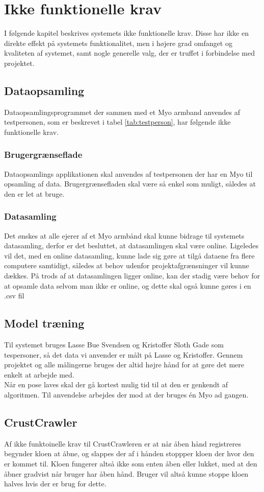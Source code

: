 \chapter{Ikke funktionelle krav}
I følgende kapitel beskrives systemets ikke funktionelle krav. Disse har ikke en direkte effekt på systemets funktionalitet, men i højere grad omfanget og kvaliteten af systemet, samt nogle generelle valg, der er truffet i forbindelse med projektet.

\section{Dataopsamling}
Dataopsamlingsprogrammet der sammen med et Myo armband anvendes af testpersonen, som er beskrevet i tabel \ref{tab:testperson}, har følgende ikke funktionelle krav.

\subsection{Brugergrænseflade}
Dataopsamlings applikationen skal anvendes af testpersonen der har en Myo til opsamling af data. Brugergrænsefladen skal være så enkel som muligt, således at den er let at bruge.

\subsection{Datasamling}
Det ønskes at alle ejerer af et Myo armbånd skal kunne bidrage til systemets datasamling, derfor er det besluttet, at datasamlingen skal være online. Ligeledes vil det, med en online datasamling, kunne lade sig gøre at tilgå dataene fra flere computere samtidigt, således at behov udenfor projektafgrænsninger vil kunne dækkes. På trods af at datasamlingen ligger online, kan der stadig være behov for at opsamle data selvom man ikke er online, og dette skal også kunne gøres i en .csv fil

\section{Model træning}
Til systemet bruges Lasse Bue Svendsen og Kristoffer Sloth Gade som tespersoner, så det data vi anvender er målt på Lasse og Kristoffer. Gennem projektet og alle målingerne bruges der altid højre hånd for at gøre det mere enkelt at arbejde med.\\
Når en pose laves skal der gå kortest mulig tid til at den er genkendt af algoritmen. Til anvendelse arbejdes der mod at der bruges én Myo ad gangen.


\section{CrustCrawler}
Af ikke funktoinelle krav til CrustCrawleren er at når åben hånd registreres begynder kloen at åbne, og slappes der af i hånden stoppper kloen der hvor den er kommet til. Kloen fungerer altså ikke som enten åben eller lukket, med at den åbner gradvist når bruger har åben hånd. Bruger vil altså kunne stoppe kloen halves hvis der er brug for dette.